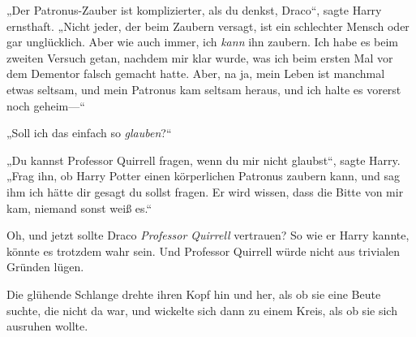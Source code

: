 „Der Patronus-Zauber ist komplizierter, als du denkst, Draco“, sagte Harry ernsthaft. „Nicht jeder, der beim Zaubern versagt, ist ein schlechter Mensch oder gar unglücklich. Aber wie auch immer, ich \emph{kann} ihn zaubern. Ich habe es beim zweiten Versuch getan, nachdem mir klar wurde, was ich beim ersten Mal vor dem Dementor falsch gemacht hatte. Aber, na ja, mein Leben ist manchmal etwas seltsam, und mein Patronus kam seltsam heraus, und ich halte es vorerst noch geheim—“

„Soll ich das einfach so \emph{glauben}?“

„Du kannst Professor Quirrell fragen, wenn du mir nicht glaubst“, sagte Harry. „Frag ihn, ob Harry Potter einen körperlichen Patronus zaubern kann, und sag ihm ich hätte dir gesagt du sollst fragen. Er wird wissen, dass die Bitte von mir kam, niemand sonst weiß es.“

Oh, und jetzt sollte Draco \emph{Professor Quirrell} vertrauen? So wie er Harry kannte, könnte es trotzdem wahr sein. Und Professor Quirrell würde nicht aus trivialen Gründen lügen.

Die glühende Schlange drehte ihren Kopf hin und her, als ob sie eine Beute suchte, die nicht da war, und wickelte sich dann zu einem Kreis, als ob sie sich ausruhen wollte.

